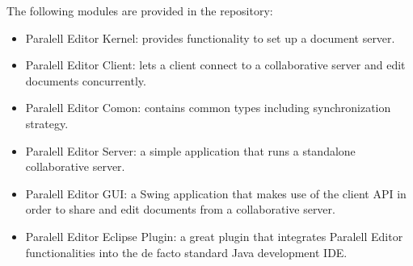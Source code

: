The following modules are provided in the repository:

\begin{itemize}
\item
  Paralell Editor Kernel: provides functionality to set up a document
  server.
\item
  Paralell Editor Client: lets a client connect to a collaborative
  server and edit documents concurrently.
\item
  Paralell Editor Comon: contains common types including
  synchronization strategy.
\item
  Paralell Editor Server: a simple application that runs a standalone
  collaborative server.
\item
  Paralell Editor GUI: a Swing application that makes use of the
  client API in order to share and edit documents from a
  collaborative server.
\item
  Paralell Editor Eclipse Plugin: a great plugin that integrates
  Paralell Editor functionalities into the de facto standard Java
  development IDE.
\end{itemize}
